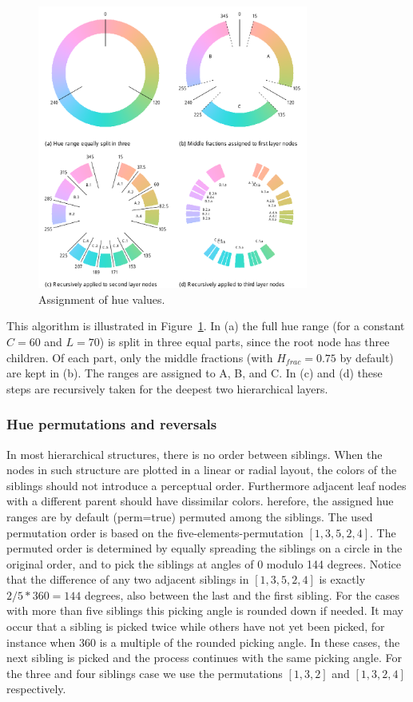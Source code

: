 \documentclass[journal]{vgtc}                %
\begin{document}
\begin{figure}[tb]
  \centering
  \includegraphics[width=3.5in]{hcl_method2.pdf}
  \caption{Assignment of hue values.}\label{fig:wheel}
\end{figure}

This algorithm is illustrated in Figure~\ref{fig:wheel}. In (a) the full hue range (for a constant $C=60$ and $L=70$)  is split in three equal parts, since the root node has three children. Of each part, only the middle fractions (with $H_{frac}=0.75$ by default) are kept in (b). The ranges are assigned to A, B, and C. In (c) and (d) these steps are recursively taken for the deepest two hierarchical layers.

\subsubsection{Hue permutations and reversals}

In most hierarchical structures, there is no order between siblings. 
When the nodes in such structure are plotted in a linear or radial layout, 
the colors of the siblings should not introduce a perceptual order. Furthermore adjacent leaf nodes with a different parent should have dissimilar colors. herefore, the assigned hue 
ranges are by default (\textsf{perm=true}) permuted among the siblings. The used permutation order is based on the five-elements-permutation $[1, 3, 5, 2, 4]$. The permuted order is determined by equally spreading the siblings on a circle in the original order, and to pick the siblings at angles of 0 modulo 144 degrees. Notice that the difference of any two adjacent siblings in $[1, 3, 5, 2, 4]$ is exactly $2/5 * 360=144$ degrees, also between the last and the first sibling. For the cases with more than five siblings this picking angle is rounded down if needed. It may occur that a sibling is picked twice while others have not yet been picked, for instance when 360 is a multiple of the rounded picking angle. In these cases, the next sibling is picked and the process continues with the same picking angle. For the three and four siblings case we use the permutations $[1, 3, 2]$ and $[1, 3, 2, 4]$ respectively. 
\end{document}
